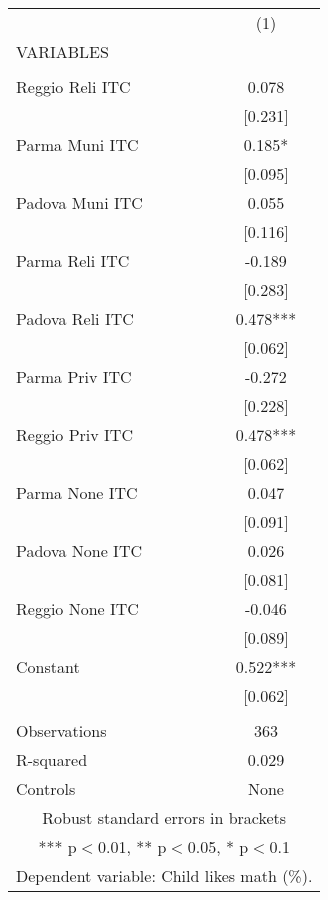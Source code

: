 \begin{tabular}{lc} \hline
 & (1) \\
VARIABLES &  \\ \hline
 &  \\
Reggio Reli ITC & 0.078 \\
 & [0.231] \\
Parma Muni ITC & 0.185* \\
 & [0.095] \\
Padova Muni ITC & 0.055 \\
 & [0.116] \\
Parma Reli ITC & -0.189 \\
 & [0.283] \\
Padova Reli ITC & 0.478*** \\
 & [0.062] \\
Parma Priv ITC & -0.272 \\
 & [0.228] \\
Reggio Priv ITC & 0.478*** \\
 & [0.062] \\
Parma None ITC & 0.047 \\
 & [0.091] \\
Padova None ITC & 0.026 \\
 & [0.081] \\
Reggio None ITC & -0.046 \\
 & [0.089] \\
Constant & 0.522*** \\
 & [0.062] \\
 &  \\
Observations & 363 \\
R-squared & 0.029 \\
 Controls & None \\ \hline
\multicolumn{2}{c}{ Robust standard errors in brackets} \\
\multicolumn{2}{c}{ *** p$<$0.01, ** p$<$0.05, * p$<$0.1} \\
\multicolumn{2}{c}{ Dependent variable: Child likes math (\%).} \\
\end{tabular}
